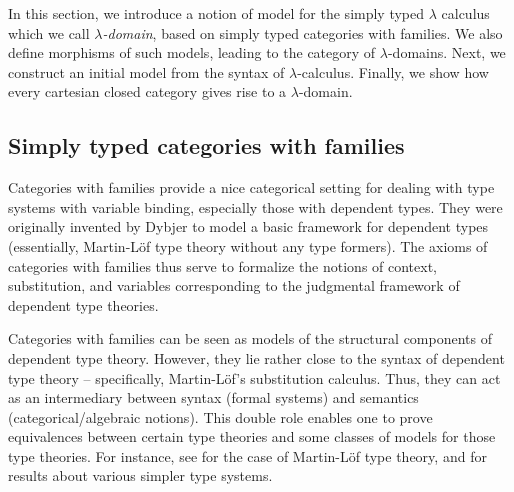 \begin{comment}
Key points
\begin{items}
\item notion of model: scwf, relate to syntax
\item morphisms of models, category of models
\item syntax is an initial model, abstract syntax: it is characterized by a universal model-theoretic property, independent of syntactic presentations (hides syntactic details, e.g. variable names vs de Bruijn indices, implicit vs explicit substitutions, preterms vs intrinsically typed/scoped terms), allows us work at an appropriate level of abstraction
\item CCCs are models (connect to previous chapter and to gluing proof)
\end{items}
\end{comment}

In this section, we introduce a notion of model for the simply typed $\lambda$ calculus which we call \textit{$\lambda$-domain}, based on simply typed categories with families. We also define morphisms of such models, leading to the category of $\lambda$-domains. Next, we construct an initial model from the syntax of $\lambda$-calculus. Finally, we show how every cartesian closed category gives rise to a $\lambda$-domain.

\subsection{Simply typed categories with families} \label{sec:scwf}


Categories with families provide a nice categorical setting for dealing with type systems with variable binding, especially those with dependent types. They were originally invented by Dybjer \cite{dybjer:1996:types} to model a basic framework for dependent types (essentially, Martin-Löf type theory without any type formers). The axioms of categories with families thus serve to formalize the notions of context, substitution, and variables corresponding to the judgmental framework of dependent type theories.

Categories with families can be seen as models of the structural components of dependent type theory. However, they lie rather close to the syntax of dependent type theory -- specifically, Martin-Löf's substitution calculus. Thus, they can act as an intermediary between syntax (formal systems) and semantics (categorical/algebraic notions). This double role enables one to prove equivalences between certain type theories and some classes of models for those type theories. For instance, see \cite{DBLP:journals/mscs/ClairambaultD14} for the case of Martin-Löf type theory, and \cite{castellan:2021:cwf} for results about various simpler type systems.

